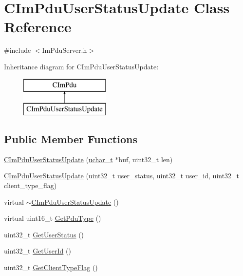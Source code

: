 \hypertarget{class_c_im_pdu_user_status_update}{}\section{C\+Im\+Pdu\+User\+Status\+Update Class Reference}
\label{class_c_im_pdu_user_status_update}


{\ttfamily \#include $<$Im\+Pdu\+Server.\+h$>$}

Inheritance diagram for C\+Im\+Pdu\+User\+Status\+Update\+:\begin{figure}[H]
\begin{center}
\leavevmode
\includegraphics[height=2.000000cm]{class_c_im_pdu_user_status_update}
\end{center}
\end{figure}
\subsection*{Public Member Functions}
\begin{DoxyCompactItemize}
\item 
\hyperlink{class_c_im_pdu_user_status_update_a5d0e26af8ea7203b2696312828daeefd}{C\+Im\+Pdu\+User\+Status\+Update} (\hyperlink{base_2ostype_8h_a124ea0f8f4a23a0a286b5582137f0b8d}{uchar\+\_\+t} $\ast$buf, uint32\+\_\+t len)
\item 
\hyperlink{class_c_im_pdu_user_status_update_a67180fc93074016d2b37d4b0d8a8a74c}{C\+Im\+Pdu\+User\+Status\+Update} (uint32\+\_\+t user\+\_\+status, uint32\+\_\+t user\+\_\+id, uint32\+\_\+t client\+\_\+type\+\_\+flag)
\item 
virtual \hyperlink{class_c_im_pdu_user_status_update_a86ba328b82f3e691ec1f24fe0b107a8f}{$\sim$\+C\+Im\+Pdu\+User\+Status\+Update} ()
\item 
virtual uint16\+\_\+t \hyperlink{class_c_im_pdu_user_status_update_a3f1cbce4ef1a3926b555448fa64ee1f1}{Get\+Pdu\+Type} ()
\item 
uint32\+\_\+t \hyperlink{class_c_im_pdu_user_status_update_abee2d7a525cd4327abbb245849338bf9}{Get\+User\+Status} ()
\item 
uint32\+\_\+t \hyperlink{class_c_im_pdu_user_status_update_afa7013cb1e24d9530194092751dbc912}{Get\+User\+Id} ()
\item 
uint32\+\_\+t \hyperlink{class_c_im_pdu_user_status_update_afe4d0ed6c7647fab8cd877baf3eac3f0}{Get\+Client\+Type\+Flag} ()
\end{DoxyCompactItemize}
